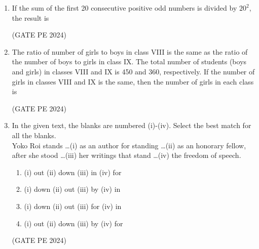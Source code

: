 \documentclass[journal,12pt,onecolumn]{IEEEtran}
\theoremstyle{remark}
\begin{document}
\begin{enumerate}
\item If the sum of the first 20 consecutive positive odd numbers is divided by $20^2$, the result is
\begin{enumerate}
\end{enumerate}
\hfill{(GATE PE 2024)}

\item The ratio of number of girls to boys in class VIII is the same as  the ratio of the number of boys to girls in class IX. The total number of students (boys and girls) in classes  VIII and IX is 450 and 360, respectively. If the number of girls in classes VIII and IX is the same, then the number of girls in each class is
\begin{enumerate}
\end{enumerate}
\hfill{(GATE PE 2024)}

\item In the given text, the blanks are numbered (i)-(iv). Select the best match for all the blanks.\\
Yoko Roi stands \dots (i) as an author for standing \dots (ii) as an honorary fellow, after she stood \dots (iii) her writings that stand \dots (iv) the freedom of speech.
\begin{enumerate}
    \item (i) out (ii) down (iii) in (iv) for
    \item (i) down (ii) out (iii) by (iv) in
    \item (i) down (ii) out (iii) for (iv) in
    \item (i) out (ii) down (iii) by (iv) for
\end{enumerate}
\hfill{(GATE PE 2024)}


\end{enumerate}
\end{document}
